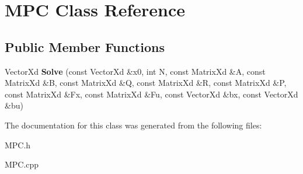 \hypertarget{classMPC}{}\section{M\+PC Class Reference}
\label{classMPC}
\subsection*{Public Member Functions}
\begin{DoxyCompactItemize}
\item 
\mbox{\label{classMPC_ab66c070c8bf92ee7d16a1ea521f6ec2f}} 
Vector\+Xd {\bfseries Solve} (const Vector\+Xd \&x0, int N, const Matrix\+Xd \&A, const Matrix\+Xd \&B, const Matrix\+Xd \&Q, const Matrix\+Xd \&R, const Matrix\+Xd \&P, const Matrix\+Xd \&Fx, const Matrix\+Xd \&Fu, const Vector\+Xd \&bx, const Vector\+Xd \&bu)
\end{DoxyCompactItemize}


The documentation for this class was generated from the following files\+:\begin{DoxyCompactItemize}
\item 
M\+P\+C.\+h\item 
M\+P\+C.\+cpp\end{DoxyCompactItemize}
